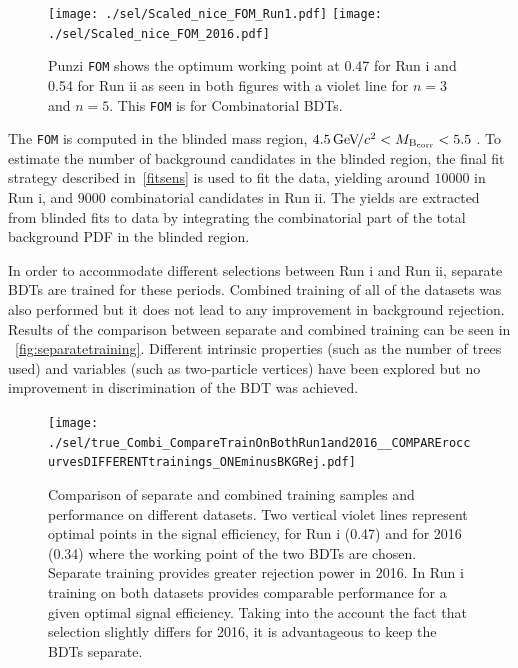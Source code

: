 \begin{figure}[ht]
\centering
	\texttt{[image: ./sel/Scaled\_nice\_FOM\_Run1.pdf]}%
	\texttt{[image: ./sel/Scaled\_nice\_FOM\_2016.pdf]}%
	\caption{ Punzi \texttt{FOM} shows the optimum working point at 0.47 for Run \Rn{1} and 0.54 for Run \Rn{2} as seen in both figures with a violet line for $n=3$ and $n=5$. This \texttt{FOM} is for Combinatorial BDTs.}
\label{fig:punzifom}
\end{figure}


The \texttt{FOM} is computed in the blinded mass region, $4.5{\mathrm{\,Ge\kern -0.1em V\!/}c^2} <M_{\mathrm{B_{corr}}} <5.5$ \gevcc. To estimate the number of background candidates in the blinded region, the final fit strategy described in~\autoref{fitsens} is used to fit the data, yielding around $10000$ in Run \Rn{1}, and $9000$ combinatorial candidates in Run \Rn{2}. The yields are extracted from blinded fits to data by integrating the combinatorial part of the total background PDF in the blinded region.

In order to accommodate different selections between Run \Rn{1} and Run \Rn{2}, separate BDTs are trained for these periods. Combined training of all of the datasets was also performed but it does not lead to any improvement in background rejection. Results of the comparison between separate and combined training can be seen in ~\autoref{fig:separatetraining}. Different intrinsic properties (such as the number of trees used) and variables (such as two-particle vertices) have been explored but no improvement in discrimination of the BDT was achieved.


\begin{figure}[ht]
\centering
\texttt{[image: ./sel/true\_Combi\_CompareTrainOnBothRun1and2016\_\_COMPAREroccurvesDIFFERENTtrainings\_ONEminusBKGRej.pdf]}
	\caption{Comparison of separate and combined training samples and performance on different datasets. Two vertical violet lines represent optimal points in the signal efficiency, for Run \Rn{1} (0.47) and for 2016 (0.34) where the working point of the two BDTs are chosen. Separate training provides greater rejection power in 2016. In Run \Rn{1} training on both datasets provides comparable performance for a given optimal signal efficiency. Taking into the account the fact that selection slightly differs for 2016, it is advantageous to keep the BDTs separate.}
\label{fig:separatetraining}
\end{figure}




